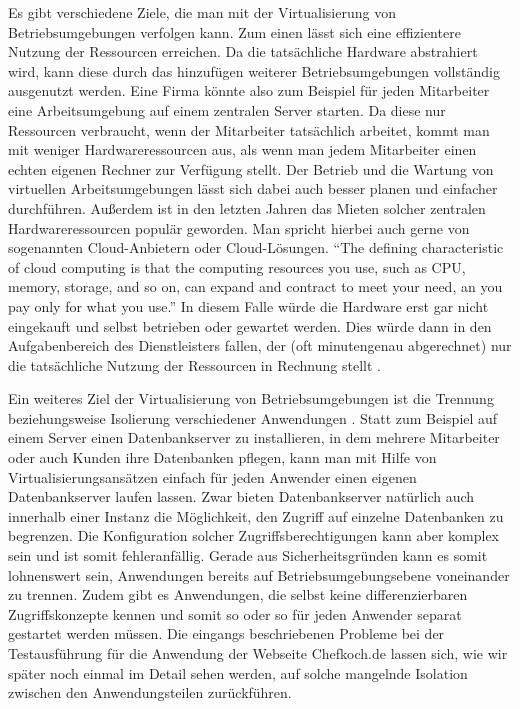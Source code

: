 Es gibt verschiedene Ziele, die man mit der Virtualisierung von Betriebsumgebungen verfolgen kann. Zum einen lässt sich eine effizientere Nutzung der Ressourcen erreichen. Da die tatsächliche Hardware abstrahiert wird, kann diese durch das hinzufügen weiterer Betriebsumgebungen vollständig ausgenutzt werden. Eine Firma könnte also zum Beispiel für jeden Mitarbeiter eine Arbeitsumgebung auf einem zentralen Server starten. Da diese nur Ressourcen verbraucht, wenn der Mitarbeiter tatsächlich arbeitet, kommt man mit weniger Hardwareressourcen aus, als wenn man jedem Mitarbeiter einen echten eigenen Rechner zur Verfügung stellt. Der Betrieb und die Wartung von virtuellen Arbeitsumgebungen lässt sich dabei auch besser planen und einfacher durchführen. Außerdem ist in den letzten Jahren das Mieten solcher zentralen Hardwareressourcen populär geworden. Man spricht hierbei auch gerne von sogenannten Cloud-Anbietern oder Cloud-Lösungen. "`The defining characteristic of cloud computing is that the computing resources you use, such as CPU, memory, storage, and so on, can expand and contract to meet your need, an you pay only for what you use."' \citep[S.][S. 312]{HumFar10} In diesem Falle würde die Hardware erst gar nicht eingekauft und selbst betrieben oder gewartet werden. Dies würde dann in den Aufgabenbereich des Dienstleisters fallen, der (oft minutengenau abgerechnet) nur die tatsächliche Nutzung der Ressourcen in Rechnung stellt \citep[Vgl.][S. 7]{ZhaChe14}.

Ein weiteres Ziel der Virtualisierung von Betriebsumgebungen ist die Trennung beziehungsweise Isolierung verschiedener Anwendungen \citep[Vgl.][Abstract]{Schee14}. Statt zum Beispiel auf einem Server einen Datenbankserver zu installieren, in dem mehrere Mitarbeiter oder auch Kunden ihre Datenbanken pflegen, kann man mit Hilfe von Virtualisierungsansätzen einfach für jeden Anwender einen eigenen Datenbankserver laufen lassen. Zwar bieten Datenbankserver natürlich auch innerhalb einer Instanz die Möglichkeit, den Zugriff auf einzelne Datenbanken zu begrenzen. Die Konfiguration solcher Zugriffsberechtigungen kann aber komplex sein und ist somit fehleranfällig. Gerade aus Sicherheitsgründen kann es somit lohnenswert sein, Anwendungen bereits auf Betriebsumgebungsebene voneinander zu trennen. Zudem gibt es Anwendungen, die selbst keine differenzierbaren Zugriffskonzepte kennen und somit so oder so für jeden Anwender separat gestartet werden müssen. Die eingangs beschriebenen Probleme bei der Testausführung für die Anwendung der Webseite Chefkoch.de lassen sich, wie wir später noch einmal im Detail sehen werden, auf solche mangelnde Isolation zwischen den Anwendungsteilen zurückführen.

